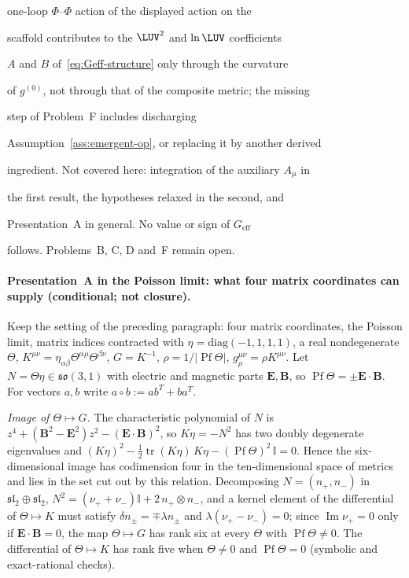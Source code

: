 one-loop \(\Phi\)--\(\Phi\) action of the displayed action on the

scaffold contributes to the \(\LUV^2\) and \(\ln\LUV\) coefficients

\(A\) and \(B\) of~\eqref{eq:Geff-structure} only through the curvature

of \(g^{(0)}\), not through that of the composite metric; the missing

step of Problem~F includes discharging

Assumption~\ref{ass:emergent-op}, or replacing it by another derived

ingredient. Not covered here: integration of the auxiliary \(A_\mu\) in

the first result, the hypotheses relaxed in the second, and

Presentation~A in general. No value or sign of \(G_{\mathrm{eff}}\)

follows. Problems~B, C, D and~F remain open.





\paragraph{Presentation~A in the Poisson limit: what four matrix coordinates can supply (conditional; not closure).} \label{detail:sec-F-paragraphpresentationainthepoi-28}

Keep the setting of the preceding paragraph: four matrix coordinates, the Poisson limit, matrix indices contracted with \(\eta=\mathrm{diag}(-1,1,1,1)\), a real nondegenerate \(\Theta\), \(K^{\mu\nu}=\eta_{\alpha\beta}\Theta^{\alpha\mu}\Theta^{\beta\nu}\), \(G=K^{-1}\), \(\rho=1/|\operatorname{Pf}\Theta|\), \(g_\rho^{\mu\nu}=\rho K^{\mu\nu}\). Let \(N=\Theta\eta\in\mathfrak{so}(3,1)\) with electric and magnetic parts \(\mathbf E,\mathbf B\), so \(\operatorname{Pf}\Theta=\pm\mathbf E\cdot\mathbf B\). For vectors \(a,b\) write \(a\circ b:=ab^T+ba^T\).



\emph{Image of \(\Theta\mapsto G\).} The characteristic polynomial of \(N\) is \(z^4+(\mathbf B^2-\mathbf E^2)z^2-(\mathbf E\cdot\mathbf B)^2\), so \(K\eta=-N^2\) has two doubly degenerate eigenvalues and \((K\eta)^2-\tfrac12\operatorname{tr}(K\eta)\,K\eta-(\operatorname{Pf}\Theta)^2\,\mathbb I=0\). Hence the six-dimensional image has codimension four in the ten-dimensional space of metrics and lies in the set cut out by this relation. Decomposing \(N=(n_+,n_-)\) in \(\mathfrak{sl}_2\oplus\mathfrak{sl}_2\), \(N^2=(\nu_++\nu_-)\mathbb I+2\,n_+\otimes n_-\), and a kernel element of the differential of \(\Theta\mapsto K\) must satisfy \(\delta n_\pm=\mp\lambda n_\pm\) and \(\lambda(\nu_+-\nu_-)=0\); since \(\operatorname{Im}\nu_+=0\) only if \(\mathbf E\cdot\mathbf B=0\), the map \(\Theta\mapsto G\) has rank six at every \(\Theta\) with \(\operatorname{Pf}\Theta\neq0\). The differential of \(\Theta\mapsto K\) has rank five when \(\Theta\neq0\) and \(\operatorname{Pf}\Theta=0\) (symbolic and exact-rational checks).



